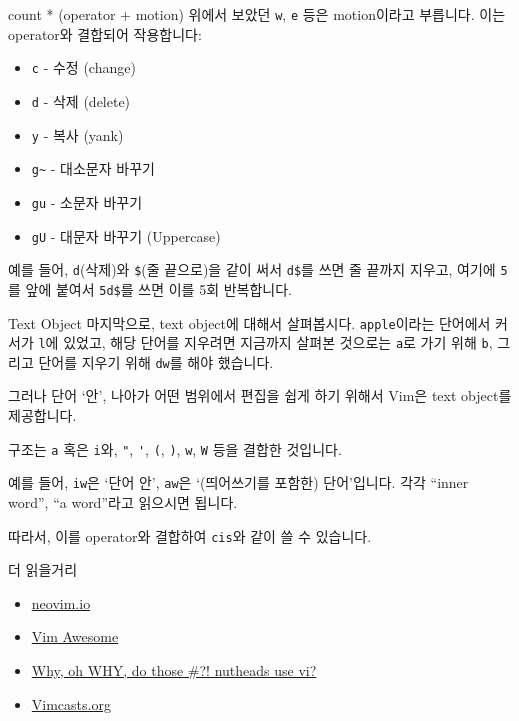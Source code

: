 \documentclass{beamer}
\begin{document}
\begin{frame}[fragile]{count * (operator + motion)}
  위에서 보았던 \verb/w/, \verb/e/ 등은 motion이라고 부릅니다.
  이는 operator와 결합되어 작용합니다:
  \begin{itemize}
    \item \verb/c/ - 수정 (\alert{c}hange)\pause
    \item \verb/d/ - 삭제 (\alert{d}elete)\pause
    \item \verb/y/ - 복사 (\alert{y}ank)\pause
    \item \verb|g~| - 대소문자 바꾸기\pause
    \item \verb/gu/ - 소문자 바꾸기\pause
    \item \verb/gU/ - 대문자 바꾸기 (\alert{U}ppercase)
  \end{itemize}\pause
  예를 들어, \verb/d/(삭제)와 \verb/$/(줄 끝으로)을 같이 써서 \verb/d$/를 쓰면
  줄 끝까지 지우고, 여기에 \verb/5/를 앞에 붙여서 \verb/5d$/를 쓰면 이를 5회
  반복합니다.
\end{frame}

\begin{frame}[fragile]{Text Object}
  마지막으로, \alert{text object}에 대해서 살펴봅시다.
  \verb/apple/이라는 단어에서 커서가 \verb/l/에 있었고, 해당 단어를 지우려면
  지금까지 살펴본 것으로는 \pause\verb/a/로 가기 위해 \verb/b/, 그리고 단어를
  지우기 위해 \verb/dw/를 해야 했습니다.\pause

  그러나 단어 `안', 나아가 어떤 범위에서 편집을 쉽게 하기 위해서 Vim은 text
  object를 제공합니다.

  구조는 \verb/a/ 혹은 \verb/i/와, \verb/"/, \verb/'/, \verb/(/, \verb/)/,
  \verb/w/, \verb/W/ 등을 결합한 것입니다.\pause

  예를 들어, \verb/iw/은 `단어 안', \verb/aw/은 `(띄어쓰기를 포함한)
  단어'입니다.
  각각 ``inner word'', ``a word''라고 읽으시면 됩니다.\pause

  따라서, 이를 operator와 결합하여 \verb/cis/와 같이 쓸 수 있습니다.
\end{frame}

\begin{frame}{더 읽을거리}
  \begin{itemize}
    \item \href{https://neovim.io/}{neovim.io}
    \item \href{https://vimawesome.com/}{Vim Awesome}
    \item \href{http://www.viemu.com/a-why-vi-vim.html}{Why, oh WHY, do those \#?\@! nutheads use vi?}
    \item \href{http://vimcasts.org/}{Vimcasts.org}
  \end{itemize}
\end{frame}
\end{document}
